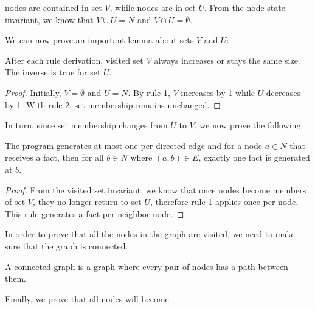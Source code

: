 \begin{definition}  nodes are contained in set $V$,
while  nodes are in set $U$. From the node state invariant, we
know that $V \cup U = N$ and $V \cap U = \emptyset$.
\end{definition}

We can now prove an important lemma about sets $V$ and $U$:

\begin{invariant}

After each rule derivation, visited set $V$ always increases or stays the same
size. The inverse is true for set $U$.

\end{invariant}
\begin{proof}
Initially, $V = \emptyset$ and $U = N$.
By rule 1, $V$ increases by 1 while $U$ decreases by 1. With rule 2, set
membership remains unchanged.
\end{proof}

In turn, since set membership changes from $U$ to $V$, we now prove the
following:

\noindent\begin{minipage}{\linewidth}
\begin{lemma}\label{lemma:language:edge_visits}
The program generates at most one  per directed edge and for a node
$a \in N$ that receives a  fact, then for all $b \in N$ where $(a,
b) \in E$, exactly one  fact is generated at $b$.
\end{lemma}
\end{minipage}
\begin{proof}
From the visited set invariant, we know that once nodes become members of set $V$,
they no longer return to set $U$, therefore rule 1 applies once per
node. This rule generates a  fact per neighbor node.
\end{proof}

In order to prove that all the nodes in the graph are visited, we need to make
sure that the graph is connected.

\begin{definition}
A connected graph is a graph where every pair of nodes has a path between them.
\end{definition}

Finally, we prove that all nodes will become .

